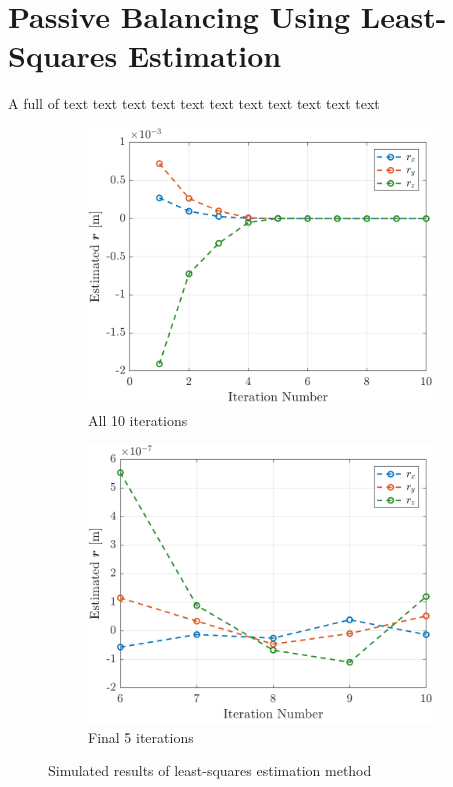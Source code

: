 \section{Passive Balancing Using Least-Squares Estimation}
A full of text text text text text text text text text text text 
\begin{figure}[!ht]
  \centering
  \begin{subfigure}[t]{0.47\textwidth}
    \includegraphics[width=\linewidth]{plots/LSR_sim_all_runs.png}
    \caption{All 10 iterations}\label{fig:a}
  \end{subfigure}\hfill
  \begin{subfigure}[t]{0.47\textwidth}
    \includegraphics[width=\linewidth]{plots/LSR_sim_last_5_runs.png}
    \caption{Final 5 iterations}\label{fig:b}
  \end{subfigure}
  \caption{Simulated results of least-squares estimation method}
  \label{fig:twopanels}
\end{figure}

